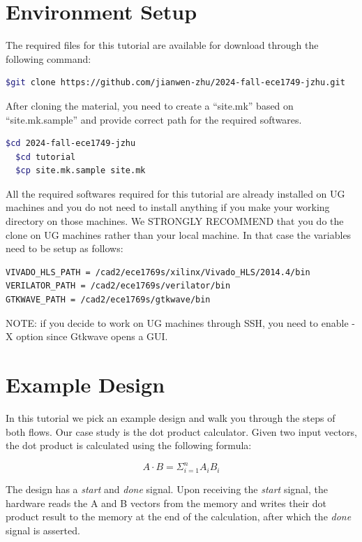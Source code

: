 \documentclass[12pt]{article}
\begin{document}
\section{Environment Setup}

The required files for this tutorial are available for download
through the following command:

\begin{lstlisting}[language=bash]
  $git clone https://github.com/jianwen-zhu/2024-fall-ece1749-jzhu.git
\end{lstlisting}

After cloning the material, you need to create a “site.mk” based on
“site.mk.sample” and provide correct path for the required softwares.

\begin{lstlisting}[language=bash]
  $cd 2024-fall-ece1749-jzhu
  $cd tutorial
  $cp site.mk.sample site.mk
\end{lstlisting}


All the required softwares required for this tutorial are already
installed on UG machines and you do not need to install anything if
you make your working directory on those machines. We STRONGLY
RECOMMEND that you do the clone on UG machines rather than your local
machine. In that case the variables need to be setup as follows:

\begin{lstlisting}[language=bash]
VIVADO_HLS_PATH = /cad2/ece1769s/xilinx/Vivado_HLS/2014.4/bin
VERILATOR_PATH = /cad2/ece1769s/verilator/bin
GTKWAVE_PATH = /cad2/ece1769s/gtkwave/bin
\end{lstlisting}

NOTE: if you decide to work on UG machines through SSH, you need to
enable -X option since Gtkwave opens a GUI.

\section{Example Design}

In this tutorial we pick an example design and walk you through the
steps of both flows. Our case study is the dot product
calculator. Given two input vectors, the dot product is calculated
using the following formula:

\[
A \cdot B = \Sigma_{i=1}^{n} A_i B_i
\]

The design has a {\em start} and {\em done} signal. Upon receiving the
{\em start} signal, the hardware reads the A and B vectors from the
memory and writes their dot product result to the memory at the end of
the calculation, after which the {\em done} signal is asserted.
\end{document}
